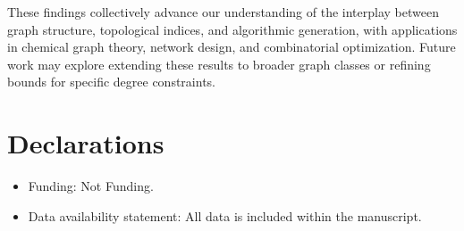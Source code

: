 \documentclass{article}
\theoremstyle{definition}
\begin{document}
These findings collectively advance our understanding of the interplay between graph structure, topological indices, and algorithmic generation, with applications in chemical graph theory, network design, and combinatorial optimization. Future work may explore extending these results to broader graph classes or refining bounds for specific degree constraints.


\section*{Declarations}
\begin{itemize}
\item Funding: Not Funding.
\item Data availability statement: All data is included within the manuscript.
\end{itemize}
\end{document}

